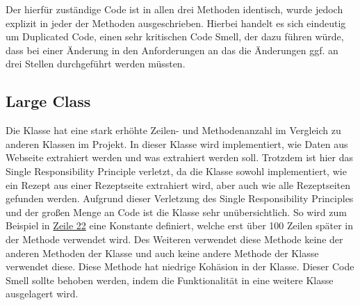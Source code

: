 Der hierfür zuständige Code ist in allen drei Methoden identisch, wurde jedoch explizit in jeder der Methoden ausgeschrieben. Hierbei handelt es sich eindeutig um Duplicated Code, einen sehr kritischen Code Smell, der dazu führen würde, dass bei einer Änderung in den Anforderungen an das  die Änderungen ggf. an drei Stellen durchgeführt werden müssten.

\subsection{Large Class}
Die Klasse \href{https://github.com/anditru/quickie/blob/bb41442c7f1ffbfcd3117cd86a40f7932e543a33/0-quickie-plugin-scraper/src/main/java/org/pinkcrazyunicorn/quickie/plugins/scraper/HensslerScraper.java}{} hat eine stark erhöhte Zeilen- und Methodenanzahl im Vergleich zu anderen Klassen im Projekt. In dieser Klasse wird implementiert, wie Daten aus Webseite extrahiert werden und was extrahiert werden soll. Trotzdem ist hier das Single Responsibility Principle verletzt, da die Klasse sowohl implementiert, wie ein Rezept aus einer Rezeptseite extrahiert wird, aber auch wie alle Rezeptseiten gefunden werden. Aufgrund dieser Verletzung des Single Responsibility Principles und der großen Menge an Code ist die Klasse sehr unübersichtlich. So wird zum Beispiel in \href{https://github.com/anditru/quickie/blob/bb41442c7f1ffbfcd3117cd86a40f7932e543a33/0-quickie-plugin-scraper/src/main/java/org/pinkcrazyunicorn/quickie/plugins/scraper/HensslerScraper.java#L22}{Zeile 22} eine Konstante definiert, welche erst über 100 Zeilen später in der Methode \href{https://github.com/anditru/quickie/blob/bb41442c7f1ffbfcd3117cd86a40f7932e543a33/0-quickie-plugin-scraper/src/main/java/org/pinkcrazyunicorn/quickie/plugins/scraper/HensslerScraper.java#L149}{} verwendet wird. Des Weiteren verwendet diese Methode keine der anderen Methoden der Klasse und auch keine andere Methode der Klasse verwendet diese. Diese Methode hat niedrige Kohäsion in der Klasse. Dieser Code Smell sollte behoben werden, indem die Funktionalität in eine weitere Klasse ausgelagert wird.

